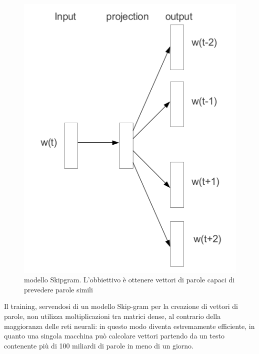 \documentclass[a4paper,12pt,openright,twoside]{report}
\theoremstyle{definition}
\begin{document}
\begin{figure}[h]
	\centering
	\includegraphics[scale=0.4]{Immagini/skipgram.png}
	\caption{modello Skipgram. L'obbiettivo è ottenere vettori di parole capaci di prevedere
	parole simili}
	\label{fig:skipgram}
\end{figure}

Il training, servendosi di un modello Skip-gram  per la creazione di vettori di parole, 
non utilizza moltiplicazioni tra matrici dense, al contrario della maggioranza delle reti 
neurali: in questo modo diventa estremamente efficiente, in quanto una singola macchina può 
calcolare vettori partendo da un testo contenente più di 100 miliardi di parole in meno di un giorno.   
\end{document}
